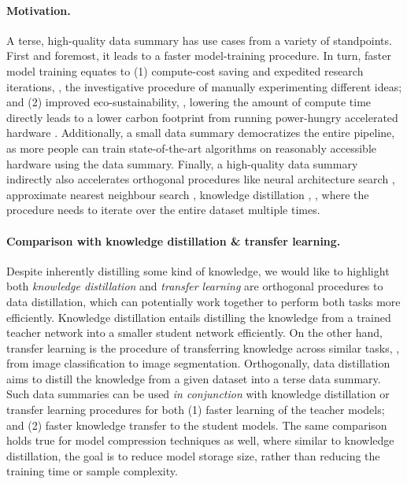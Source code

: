\documentclass[10pt]{article} %
\begin{document}
\paragraph{Motivation.} A terse, high-quality data summary has use cases from a variety of standpoints. First and foremost, it leads to a faster model-training procedure. In turn, faster model training equates to (1) compute-cost saving and expedited research iterations, \ie, the investigative procedure of manually experimenting different ideas; 
and (2) improved eco-sustainability, \ie, lowering the amount of compute time directly leads to a lower carbon footprint from running power-hungry accelerated hardware \citep{chasing_carbon}. Additionally, a small data summary democratizes the entire pipeline, as more people can train state-of-the-art algorithms on reasonably accessible hardware using the data summary. Finally, 
a high-quality data summary indirectly also accelerates orthogonal procedures like neural architecture search \citep{darts_nas}, approximate nearest neighbour search \citep{ann}, knowledge distillation \citep{knowledge_distillation}, \etc, where the procedure needs to iterate over the entire dataset multiple times.

\paragraph{Comparison with knowledge distillation \& transfer learning.} Despite 
inherently distilling some kind of knowledge, we would like to highlight both \emph{knowledge distillation} and \emph{transfer learning} are orthogonal procedures to data distillation, which can potentially work together to perform both tasks more efficiently. Knowledge distillation \citep{knowledge_distillation} entails distilling the knowledge from a trained teacher network into a smaller student network efficiently. On the other hand, transfer learning \citep{transfer_learning} is the procedure of transferring knowledge across similar tasks, \eg, from image classification to image segmentation. Orthogonally, data distillation aims to distill the knowledge from a given dataset into a terse data summary. Such data summaries can be used \emph{in conjunction} with knowledge distillation or transfer learning procedures for both (1) faster learning of the teacher models; and (2) faster knowledge transfer to the student models. The same comparison holds true for model compression techniques \citep{model_compression} as well, where similar to knowledge distillation, the goal is to reduce model storage size, rather than reducing the training time or sample complexity.
\end{document}
